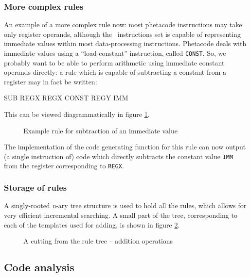 \subsubsection{More complex rules}

An example of a more complex rule now: most phetacode instructions may take only register operands, although the \ia\ instructions set is capable of representing immediate values within most data-processing instructions. Phetacode deals with immediate values using a ``load-constant'' instruction, called {\tt CONST}. So, we probably want to be able to perform arithmetic using immediate constant operands directly: a rule which is capable of subtracting a constant from a register may in fact be written:

\begin{code}
SUB REGX REGX CONST REGY IMM
\end{code}

This can be viewed diagrammatically in figure \ref{subimmrule}.

\begin{figure}[tbh]

\centerline{}

\caption{\label{subimmrule}Example rule for subtraction of an immediate value}
\end{figure}

The implementation of the code generating function for this rule can now output (a single instruction of) code which directly subtracts the constant value {\tt IMM} from the register corresponding to {\tt REGX}.

\subsubsection{Storage of rules}

A singly-rooted {\it n}-ary tree structure is used to hold all the rules, which allows for very efficient incremental searching. A small part of the tree, corresponding to each of the templates used for adding, is shown in figure \ref{rulestore}.

\begin{figure}[tbh]

\centerline{}

\caption{\label{rulestore}A cutting from the rule tree -- addition operations}
\end{figure}

\subsection{Code analysis}

